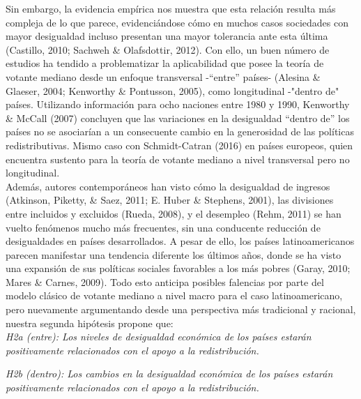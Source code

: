 \documentclass[12pt,letterpaper]{article}
\begin{document}
Sin embargo, la evidencia empírica nos muestra que esta relación resulta más compleja de lo que parece, evidenciándose cómo en muchos casos sociedades con mayor desigualdad incluso presentan una mayor tolerancia ante esta última (Castillo, 2010; Sachweh \& Olafsdottir, 2012). Con ello, un buen número de estudios ha tendido a problematizar la aplicabilidad que posee la teoría de votante mediano desde un enfoque transversal -“entre” países- (Alesina \& Glaeser, 2004; Kenworthy \& Pontusson, 2005), como longitudinal -"dentro de" países. Utilizando información para ocho naciones entre 1980 y 1990, Kenworthy \& McCall (2007) concluyen que las variaciones en la desigualdad “dentro de” los países no se asociarían a un consecuente cambio en la generosidad de las políticas redistributivas. Mismo caso con Schmidt-Catran (2016) en países europeos, quien encuentra sustento para la teoría de votante mediano a nivel transversal pero no longitudinal.\\

Además, autores contemporáneos han visto cómo la desigualdad de ingresos (Atkinson, Piketty, \& Saez, 2011; E. Huber \& Stephens, 2001), las divisiones entre incluidos y excluidos (Rueda, 2008), y el desempleo (Rehm, 2011) se han vuelto fenómenos mucho más frecuentes, sin una conducente reducción de desigualdades en países desarrollados. A pesar de ello, los países latinoamericanos parecen manifestar una tendencia diferente los últimos años, donde se ha visto una expansión de sus políticas sociales favorables a los más pobres (Garay, 2010; Mares \& Carnes, 2009). Todo esto anticipa posibles falencias por parte del modelo clásico de votante mediano a nivel macro para el caso latinoamericano, pero nuevamente argumentando desde una perspectiva más tradicional y racional, nuestra segunda hipótesis propone que:\\

\textit{H2a (entre): Los niveles de desigualdad económica de los países estarán positivamente relacionados con el apoyo a la redistribución.}

\textit{H2b (dentro): Los cambios en la desigualdad económica de los países estarán positivamente relacionados con el apoyo a la redistribución.}\\
\end{document}
